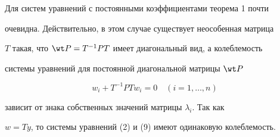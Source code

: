 \begin{note} 


Для систем уравнений с постоянными коэффициентами теорема 1 почти 


очевидна. Действительно, в этом случае существует неособенная матрица 


$T$ такая, что $\wt P=T^{-1}PT$ имеет диагональный вид, а колеблемость 


системы уравнений для постоянной диагональной матрицы $\wt P$ 


\begin{equation} 


w_i+T^{-1}PT w_i=0\quad(i=1,\dotsc,n) 


\end{equation} 


зависит от знака собственных значений матрицы $\lambda_i$. Так как 


$w=Ty$, то системы уравнений (2) и (9) имеют одинаковую колеблемость. 


\end{note} 


 


